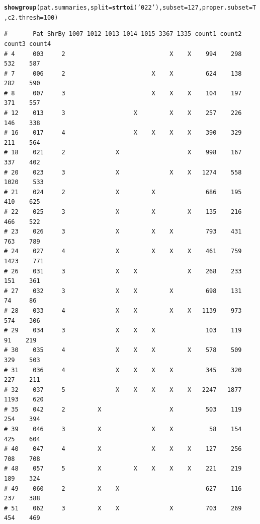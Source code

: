\documentclass{article}\usepackage[]{graphicx}\usepackage[]{color}
\makeatletter
\newcommand{\hlnum}[1]{\textcolor[rgb]{0.686,0.059,0.569}{#1}}%
\newcommand{\hlstr}[1]{\textcolor[rgb]{0.192,0.494,0.8}{#1}}%
\newcommand{\hlstd}[1]{\textcolor[rgb]{0.345,0.345,0.345}{#1}}%
\newcommand{\hlkwc}[1]{\textcolor[rgb]{0.333,0.667,0.333}{#1}}%
\newcommand{\hlkwd}[1]{\textcolor[rgb]{0.737,0.353,0.396}{\textbf{#1}}}%
\newenvironment{kframe}{%
 \def\at@end@of@kframe{}%
 \ifinner\ifhmode%
  \def\at@end@of@kframe{\end{minipage}}%
  \begin{minipage}{\columnwidth}%
 \fi\fi%
 \def\FrameCommand##1{\hskip\@totalleftmargin \hskip-\fboxsep
 \colorbox{shadecolor}{##1}\hskip-\fboxsep
     \hskip-\linewidth \hskip-\@totalleftmargin \hskip\columnwidth}%
 \MakeFramed {\advance\hsize-\width
   \@totalleftmargin\z@ \linewidth\hsize
   \@setminipage}}%
 {\par\unskip\endMakeFramed%
 \at@end@of@kframe}
\newenvironment{knitrout}{}{} %
\makeatother
\begin{document}
\begin{knitrout}\footnotesize
{}\color{fgcolor}\begin{kframe}
\begin{alltt}
\hlkwd{showgroup}\hlstd{(pat.summaries,}\hlkwc{split}\hlstd{=}\hlkwd{strtoi}\hlstd{(}\hlstr{'022'}\hlstd{),} \hlkwc{subset}\hlstd{=}\hlnum{127}\hlstd{,} \hlkwc{proper.subset}\hlstd{=T,} \hlkwc{c2.thresh}\hlstd{=}\hlnum{100}\hlstd{)}
\end{alltt}
\begin{verbatim}
#       Pat ShrBy 1007 1012 1013 1014 1015 3367 1335 count1 count2 count3 count4
# 4     003     2                             X    X    994    298    532    587
# 7     006     2                        X    X         624    138    282    590
# 8     007     3                        X    X    X    104    197    371    557
# 12    013     3                   X         X    X    257    226    146    338
# 16    017     4                   X    X    X    X    390    329    211    564
# 18    021     2              X                   X    998    167    337    402
# 20    023     3              X              X    X   1274    558   1020    533
# 21    024     2              X         X              686    195    410    625
# 22    025     3              X         X         X    135    216    466    522
# 23    026     3              X         X    X         793    431    763    789
# 24    027     4              X         X    X    X    461    759   1423    771
# 26    031     3              X    X              X    268    233    151    361
# 27    032     3              X    X         X         698    131     74     86
# 28    033     4              X    X         X    X   1139    973    574    306
# 29    034     3              X    X    X              103    119     91    219
# 30    035     4              X    X    X         X    578    509    329    503
# 31    036     4              X    X    X    X         345    320    227    211
# 32    037     5              X    X    X    X    X   2247   1877   1193    620
# 35    042     2         X                   X         503    119    254    394
# 39    046     3         X              X    X          58    154    425    604
# 40    047     4         X              X    X    X    127    256    708    708
# 48    057     5         X         X    X    X    X    221    219    189    324
# 49    060     2         X    X                        627    116    237    388
# 51    062     3         X    X              X         703    269    454    469

\end{verbatim}
\end{kframe}
\end{knitrout}
\end{document}
